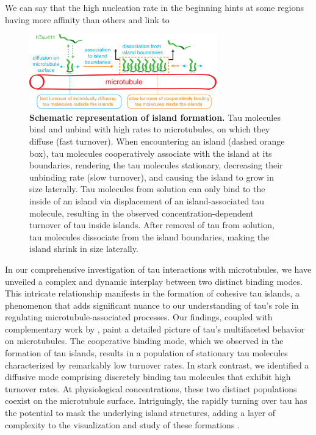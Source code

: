 
We can say that the high nucleation rate in the beginning hints at some regions having more affinity than others and link to \cite{siahaan2022microtubule}

\begin{figure}[h!tb]
\centering
\includegraphics[scale=1]{Figures/tau8.png}
\caption[Schematic representation of island formation.]{
\textbf{Schematic representation of island formation.} Tau molecules bind and unbind with high rates to microtubules, on which they diffuse (fast turnover). When encountering an island (dashed orange box), tau molecules cooperatively associate with the island at its boundaries, rendering the tau molecules stationary, decreasing their unbinding rate (slow turnover), and causing the island to grow in size laterally. Tau molecules from solution can only bind to the inside of an island via displacement of an island-associated tau molecule, resulting in the observed concentration-dependent turnover of tau inside islands. After removal of tau from solution, tau molecules dissociate from the island boundaries, making the island shrink in size laterally.
	}\label{tau8}
\end{figure}
In our comprehensive investigation of tau interactions with microtubules, we have unveiled a complex and dynamic interplay between two distinct binding modes. This intricate relationship manifests in the formation of cohesive tau islands, a phenomenon that adds significant nuance to our understanding of tau's role in regulating microtubule-associated processes. Our findings, coupled with complementary work by \cite{tan2019microtubules}, paint a detailed picture of tau's multifaceted behavior on microtubules.
The cooperative binding mode, which we observed in the formation of tau islands, results in a population of stationary tau molecules characterized by remarkably low turnover rates. In stark contrast, we identified a diffusive mode comprising discretely binding tau molecules that exhibit high turnover rates. At physiological concentrations, these two distinct populations coexist on the microtubule surface. Intriguingly, the rapidly turning over tau has the potential to mask the underlying island structures, adding a layer of complexity to the visualization and study of these formations .
